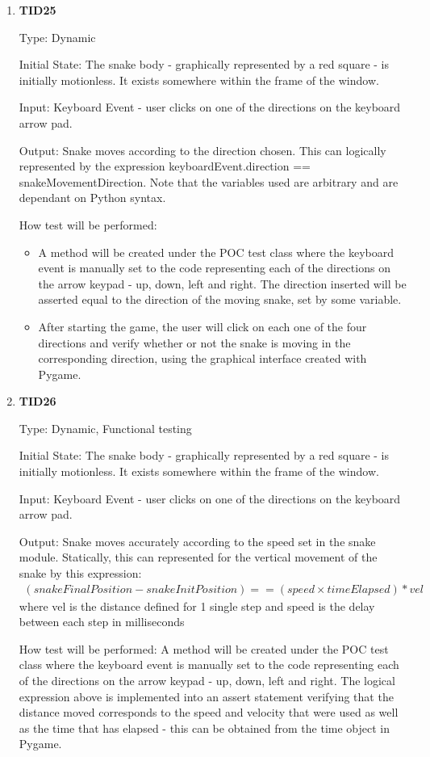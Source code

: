 \documentclass[12pt, titlepage]{article}
\begin{document}
\begin{enumerate}

\item{\textbf{TID25}\\}

Type: Dynamic
					
Initial State: The snake body - graphically represented by a red square - is initially motionless. It exists somewhere within the frame of the window.
					
Input: Keyboard Event - user clicks on one of the directions on the keyboard arrow pad.
					
Output: Snake moves according to the direction chosen. This can logically represented by the expression keyboardEvent.direction == snakeMovementDirection. Note that the variables used are arbitrary and are dependant on Python syntax.
					
How test will be performed:
\begin{itemize}
\item A method will be created under the POC test class where the keyboard event is manually set to the code representing each of the directions on the arrow keypad - up, down, left and right. The direction inserted will be asserted equal to the direction of the moving snake, set by some variable.
\item After starting the game, the user will click on each one of the four directions and verify whether or not the snake is moving in the corresponding direction, using the graphical interface created with Pygame.
\end{itemize}
			
\item{\textbf{TID26}\\}

Type: Dynamic, Functional testing
					
Initial State: The snake body - graphically represented by a red square - is initially motionless. It exists somewhere within the frame of the window.
					
Input: Keyboard Event - user clicks on one of the directions on the keyboard arrow pad.  
					
Output: Snake moves accurately according to the speed set in the snake module. Statically, this can represented for the vertical movement of the snake by this expression:
\begin{align*}
	(snakeFinalPosition - snakeInitPosition) == (speed \times timeElapsed)*vel
\end{align*}
 where vel is the distance defined for 1 single step and speed is the delay between each step in milliseconds		

			
How test will be performed: A method will be created under the POC test class where the keyboard event is manually set to the code representing each of the directions on the arrow keypad - up, down, left and right. The logical expression above is implemented into an assert statement verifying that the distance moved corresponds to the speed and velocity that were used as well as the time that has elapsed - this can be obtained from the time object in Pygame.


\end{enumerate}
\end{document}
